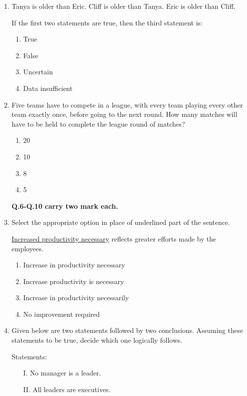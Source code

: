 \documentclass[journal]{IEEEtran}
\numberwithin{equation}{enumi}
\numberwithin{figure}{enumi}
\begin{document}
\begin{enumerate}
\item Tanya is older than Eric.
Cliff is older than Tanya. 
Eric is older than Cliff. 

If the first two statements are true, then the third statement is:
\hfill{}
\begin{enumerate}
    \item True
    \item False
    \item Uncertain
    \item Data insufficient
\end{enumerate}

\item Five teams have to compete in a league, with every team playing every other team exactly once, before going to the next round. How many matches will have to be held to complete the league round of matches?
\hfill{}
\begin{multicols}{4}
\begin{enumerate}
    \item 20
    \item 10
    \item 8
    \item 5
\end{enumerate}
\end{multicols}


\textbf{Q.6-Q.10 carry two mark each.}
\bigskip
\item Select the appropriate option in place of underlined part of the sentence.

\underline{Increased productivity necessary} reflects greater efforts made by the employees.

\begin{enumerate}
    \item Increase in productivity necessary \hfill{}
    \item Increase productivity is necessary
    \item Increase in productivity necessarily
    \item No improvement required
\end{enumerate}

\item Given below are two statements followed by two conclusions. Assuming these statements to be true, decide which one logically follows. \hfill{}

Statements:
\begin{enumerate}
    \item[I.] No manager is a leader.
    \item[II.] All leaders are executives.
\end{enumerate}


\end{enumerate}
\end{document}
